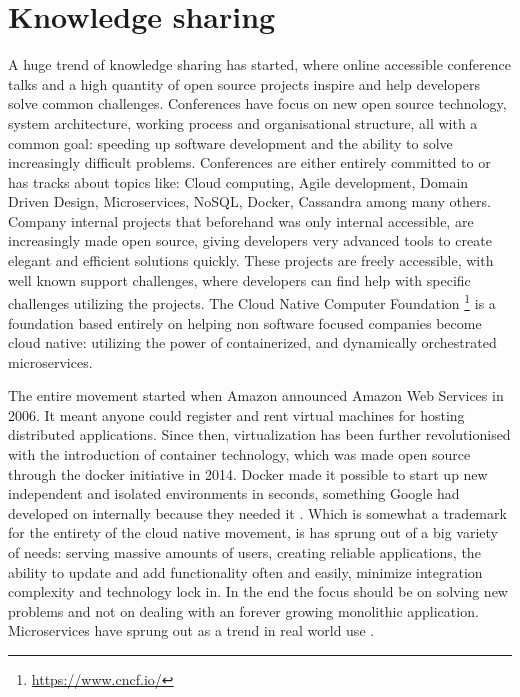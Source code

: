\section{Knowledge sharing}
A huge trend of knowledge sharing has started, where online accessible conference talks and a high quantity of open source projects inspire and help developers solve common challenges. Conferences have focus on new open source technology, system architecture, working process and organisational structure, all with a common goal: speeding up software development and the ability to solve increasingly difficult problems. Conferences are either entirely committed to or has tracks about topics like: Cloud computing, Agile development, Domain Driven Design, Microservices, NoSQL, Docker, Cassandra among many others\cite{george2016it}. Company internal projects that beforehand was only internal accessible, are increasingly made open source, giving developers very advanced tools to create elegant and efficient solutions quickly. These projects are freely accessible, with well known support challenges, where developers can find help with specific challenges utilizing the projects. The Cloud Native Computer Foundation \footnote{\url{https://www.cncf.io/}} is a foundation based entirely on helping non software focused companies become cloud native: utilizing the power of containerized, and dynamically orchestrated microservices.

The entire movement started when Amazon announced Amazon Web Services in 2006. It meant anyone could register and rent virtual machines for hosting distributed applications. Since then, virtualization has been further revolutionised with the introduction of container technology, which was made open source through the docker initiative in 2014. Docker made it possible to start up new independent and isolated environments in seconds, something Google had developed on internally because they needed it \cite{bernstein2014containers}. Which is somewhat a trademark for the entirety of the cloud native movement, is has sprung out of a big variety of needs: serving massive amounts of users, creating reliable applications, the ability to update and add functionality often and easily, minimize integration complexity and technology lock in. In the end the focus should be on solving new problems and not on dealing with an forever growing monolithic application. Microservices have sprung out as a trend in real world use \cite[p.~1]{newman2015microservices}.

